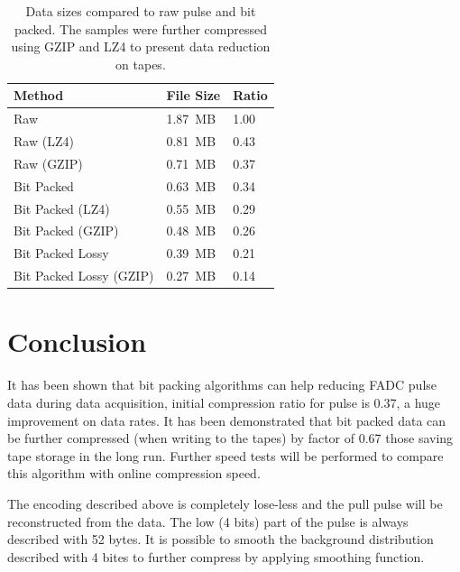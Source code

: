 \documentclass[12pt]{article}
\begin{document}
\begin{table}[!h]
\begin{center}
\begin{tabular}{  p{8cm} | p{2cm} | p{1.5cm} }
\hline 
Method & File Size & Ratio \\
\hline 
\hline 
Raw & 1.87~MB & 1.00 \\
Raw (LZ4) & 0.81~MB & 0.43 \\
Raw (GZIP) & 0.71~MB & 0.37 \\
\rowcolor{LightCyan}
Bit Packed &  0.63~MB & 0.34 \\
Bit Packed (LZ4) & 0.55~MB & 0.29 \\
\rowcolor{LightRose}
Bit Packed (GZIP) & 0.48~MB & 0.26 \\
Bit Packed Lossy  & 0.39~MB & 0.21 \\
\rowcolor{LightGreen}
Bit Packed Lossy (GZIP) & 0.27~MB & 0.14 \\
\hline
\end{tabular}
\caption{Data sizes compared to raw pulse and bit packed. The samples were further
compressed using GZIP and LZ4 to present data reduction on tapes.}
\end{center}
\end{table}

\section{Conclusion}

It has been shown that bit packing algorithms can help reducing FADC pulse data during data
acquisition, initial compression ratio for pulse is 0.37, a huge improvement on data rates. It has
been demonstrated that bit packed data can be further compressed (when writing to the tapes)
by factor of 0.67 those saving tape storage in the long run. Further speed tests will be performed 
to compare this algorithm with online compression speed.

The encoding described above is completely lose-less and the pull pulse will be reconstructed 
from the data. The low (4 bits) part of the pulse is always described with 52 bytes. It is possible
to smooth the background distribution described with 4 bites to further compress by applying 
smoothing function. 
\end{document}
